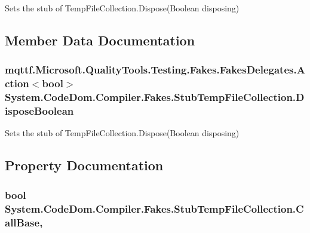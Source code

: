 Sets the stub of Temp\-File\-Collection.\-Dispose(\-Boolean disposing)



\subsection{Member Data Documentation}
\hypertarget{class_system_1_1_code_dom_1_1_compiler_1_1_fakes_1_1_stub_temp_file_collection_a481d78d602c73edb34630cd004ab534b}{
\subsubsection[{Dispose\-Boolean}]{\setlength{\rightskip}{0pt plus 5cm}mqttf.\-Microsoft.\-Quality\-Tools.\-Testing.\-Fakes.\-Fakes\-Delegates.\-Action$<$bool$>$ System.\-Code\-Dom.\-Compiler.\-Fakes.\-Stub\-Temp\-File\-Collection.\-Dispose\-Boolean}}\label{class_system_1_1_code_dom_1_1_compiler_1_1_fakes_1_1_stub_temp_file_collection_a481d78d602c73edb34630cd004ab534b}


Sets the stub of Temp\-File\-Collection.\-Dispose(\-Boolean disposing)



\subsection{Property Documentation}
\hypertarget{class_system_1_1_code_dom_1_1_compiler_1_1_fakes_1_1_stub_temp_file_collection_a606ada52bc940922d119e967d2b0626c}{
\subsubsection[{Call\-Base}]{\setlength{\rightskip}{0pt plus 5cm}bool System.\-Code\-Dom.\-Compiler.\-Fakes.\-Stub\-Temp\-File\-Collection.\-Call\-Base\hspace{0.3cm}{\ttfamily [get]}, {\ttfamily [set]}}}\label{class_system_1_1_code_dom_1_1_compiler_1_1_fakes_1_1_stub_temp_file_collection_a606ada52bc940922d119e967d2b0626c}


